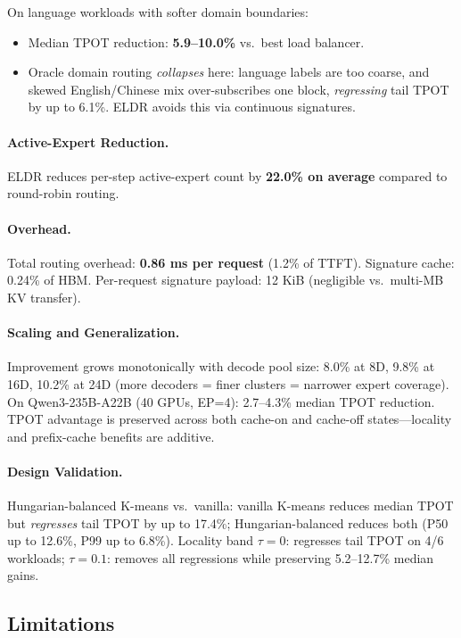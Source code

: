 \documentclass[11pt,a4paper]{article}
\begin{document}
On language workloads with softer domain boundaries:
\begin{itemize}
\item Median TPOT reduction: \textbf{5.9--10.0\%} vs.\ best load balancer.
\item Oracle domain routing \emph{collapses} here: language labels are too coarse, and skewed English/Chinese mix over-subscribes one block, \emph{regressing} tail TPOT by up to 6.1\%. ELDR avoids this via continuous signatures.
\end{itemize}

\paragraph{Active-Expert Reduction.} ELDR reduces per-step active-expert count by \textbf{22.0\% on average} compared to round-robin routing.

\paragraph{Overhead.} Total routing overhead: \textbf{0.86 ms per request} (1.2\% of TTFT). Signature cache: 0.24\% of HBM. Per-request signature payload: 12 KiB (negligible vs.\ multi-MB KV transfer).

\paragraph{Scaling and Generalization.} Improvement grows monotonically with decode pool size: 8.0\% at 8D, 9.8\% at 16D, 10.2\% at 24D (more decoders = finer clusters = narrower expert coverage). On Qwen3-235B-A22B (40 GPUs, EP=4): 2.7--4.3\% median TPOT reduction. TPOT advantage is preserved across both cache-on and cache-off states---locality and prefix-cache benefits are additive.

\paragraph{Design Validation.} Hungarian-balanced K-means vs.\ vanilla: vanilla K-means reduces median TPOT but \emph{regresses} tail TPOT by up to 17.4\%; Hungarian-balanced reduces both (P50 up to 12.6\%, P99 up to 6.8\%). Locality band $\tau = 0$: regresses tail TPOT on 4/6 workloads; $\tau = 0.1$: removes all regressions while preserving 5.2--12.7\% median gains.

\subsection{Limitations}
\end{document}
